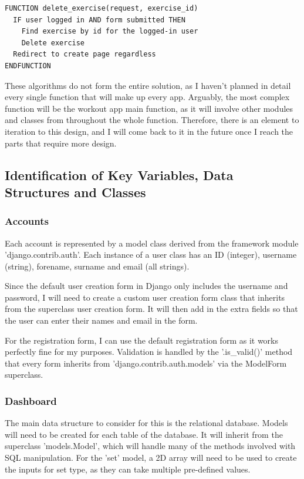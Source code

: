 \documentclass{article}
\begin{document}
\begin{lstlisting}[caption={Exercise deletion view}]
  FUNCTION delete_exercise(request, exercise_id)
  IF user logged in AND form submitted THEN
    Find exercise by id for the logged-in user
    Delete exercise
  Redirect to create page regardless
ENDFUNCTION
\end{lstlisting}

These algorithms do not form the entire solution, as I haven't planned in detail every single function that will make up every app. Arguably, the most complex function will be the workout app main function, as it will involve other modules and classes from throughout the whole function. Therefore, there is an element to iteration to this design, and I will come back to it in the future once I reach the parts that require more design.

\subsection{Identification of Key Variables, Data Structures and Classes}

\subsubsection{Accounts}

Each account is represented by a model class derived from the framework module 'django.contrib.auth'. Each instance of a user class has an ID (integer), username (string), forename, surname and email (all strings). 

Since the default user creation form in Django only includes the username and password, I will need to create a custom user creation form class that inherits from the superclass user creation form. It will then add in the extra fields so that the user can enter their names and email in the form. 

For the registration form, I can use the default registration form as it works perfectly fine for my purposes. Validation is handled by the '.is\_valid()' method that every form inherits from 'django.contrib.auth.models' via the ModelForm superclass. 

\subsubsection{Dashboard}

The main data structure to consider for this is the relational database. Models will need to be created for each table of the database. It will inherit from the superclass 'models.Model', which will handle many of the methods involved with SQL manipulation. For the 'set' model, a 2D array will need to be used to create the inputs for set type, as they can take multiple pre-defined values. 
\end{document}
